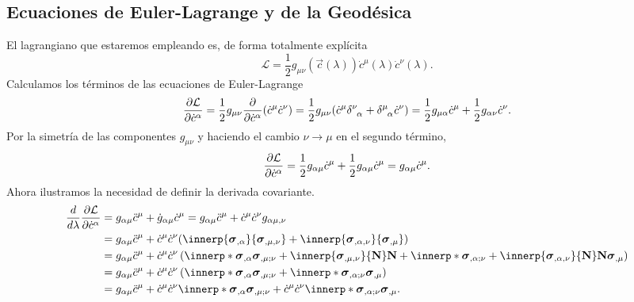 \subsection{Ecuaciones de Euler-Lagrange y de la Geodésica}
El lagrangiano que estaremos empleando es, de forma totalmente explícita
\begin{equation}\label{eq: lagrangian}
	\mathcal L = \frac12g_{\mu\nu}(\vec c(\lambda)) \dot c^\mu(\lambda) \dot c^\nu(\lambda).
\end{equation}
Calculamos los términos de las ecuaciones de Euler-Lagrange
\begin{equation}
	\partialD{\mathcal L}{\dot c^\alpha} = \frac12 g_{\mu\nu} \partialD{}{\dot c^\alpha}(\dot c^\mu \dot c^\nu)
	= \frac12 g_{\mu\nu}(\dot c^\mu \delta\indices{^\nu_\alpha}  +\delta\indices{^\mu_\alpha} \dot c^\nu )
	= \frac12 g_{\mu\alpha}\dot c^\mu + \frac12 g_{\alpha\nu}\dot c^\nu.
\end{equation}
Por la simetría de las componentes $g_{\mu\nu}$ y haciendo el cambio $\nu \to \mu$ en el segundo término,
\begin{equation}
	\frac{\partial \mathcal L}{\partial \dot c^\alpha} = \frac12 g_{\alpha\mu}\dot c^\mu + \frac12 g_{\alpha\mu}\dot c^\mu
	= g_{\alpha\mu}\dot c^\mu.
\end{equation}
Ahora ilustramos la necesidad de definir la derivada covariante.
\begin{equation}
\begin{split}
	\frac{d}{d\lambda}\partialD{\mathcal L}{\dot c^\alpha}
	&= g_{\alpha\mu}\ddot c^\mu + \dot g_{\alpha\mu}\dot c^\mu
	= g_{\alpha\mu}\ddot c^\mu + \dot c^\mu\dot c^\nu g_{\alpha\mu,\nu}\\
	 &= g_{\alpha\mu}\ddot c^\mu + \dot c^\mu\dot c^\nu(\innerp{\patch_{,\alpha}}{\patch_{,\mu,\nu}} + \innerp{\patch_{,\alpha, \nu}}{\patch_{,\mu}})\\
	&=g_{\alpha\mu}\ddot c^\mu +  \dot c^\mu\dot c^\nu  \left(
	\innerp*{\patch_{,\alpha}}{\patch_{,\mu; \nu} + \innerp{\patch_{,\mu,\nu}}{\vec N}\vec N} + \innerp*{\patch_{,\alpha; \nu} + \innerp{\patch_{,\alpha,\nu}}{\vec N}\vec N}{\patch_{,\mu}}
	\right)\\
	&= g_{\alpha\mu}\ddot c^\mu +  \dot c^\mu\dot c^\nu  \left(
	\innerp*{\patch_{,\alpha}}{\patch_{,\mu; \nu} } + \innerp*{\patch_{,\alpha; \nu}}{\patch_{,\mu}}
	\right)\\
	&=  g_{\alpha\mu}\ddot c^\mu +  \dot c^\mu\dot c^\nu 
	\innerp*{\patch_{,\alpha}}{\patch_{,\mu; \nu} } + \dot c^\mu\dot c^\nu \innerp*{\patch_{,\alpha; \nu}}{\patch_{,\mu}}.
\end{split}
\end{equation}
